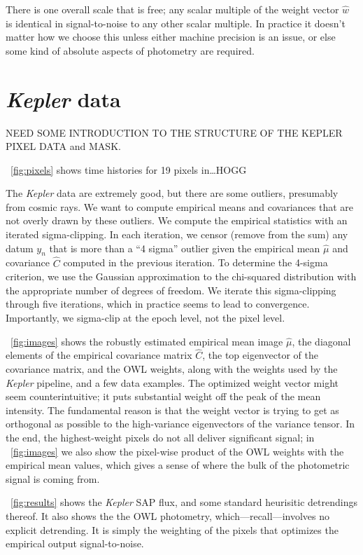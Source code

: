\documentclass[12pt, letterpaper, preprint]{aastex}
\newcommand{\project}[1]{\textsl{#1}}
\begin{document}
There is one overall scale that is free;
  any scalar multiple of the weight vector $\hat{w}$ is identical in signal-to-noise
  to any other scalar multiple.
In practice it doesn't matter how we choose this unless either machine precision is an issue,
  or else some kind of absolute aspects of photometry are required.

\section{\project{Kepler} data}

NEED SOME INTRODUCTION TO THE STRUCTURE OF THE KEPLER PIXEL DATA and MASK.

\figurename~\ref{fig:pixels} shows time histories for 19 pixels in\ldots HOGG

The \project{Kepler} data are extremely good, but there are some outliers,
  presumably from cosmic rays.
We want to compute empirical means and covariances that are not overly drawn by these outliers.
We compute the empirical statistics with an iterated sigma-clipping.
In each iteration, we censor (remove from the sum)
  any datum $y_n$ that is more than a ``4 sigma'' outlier
  given the empirical mean $\hat{\mu}$ and covariance $\hat{C}$ computed in the previous iteration.
To determine the 4-sigma criterion, we use the Gaussian approximation to the chi-squared distribution
  with the appropriate number of degrees of freedom.
We iterate this sigma-clipping through five iterations,
  which in practice seems to lead to convergence.
Importantly, we sigma-clip at the epoch level, not the pixel level.

\figurename~\ref{fig:images} shows the robustly estimated empirical mean image $\hat{\mu}$,
  the diagonal elements of the empirical covariance matrix $\hat{C}$,
  the top eigenvector of the covariance matrix,
  and the OWL weights, along with the weights used by the \project{Kepler} pipeline,
  and a few data examples.
The optimized weight vector might seem counterintuitive;
  it puts substantial weight off the peak of the mean intensity.
The fundamental reason is that the weight vector is trying to get as orthogonal as possible
  to the high-variance eigenvectors of the variance tensor.
In the end, the highest-weight pixels do not all deliver significant signal;
  in \figurename~\ref{fig:images} we also show
  the pixel-wise product of the OWL weights with the empirical mean values,
  which gives a sense of where the bulk of the photometric signal is coming from.

\figurename~\ref{fig:results} shows the \project{Kepler} SAP flux,
  and some standard heurisitic detrendings thereof.
It also shows the the OWL photometry,
  which---recall---involves no explicit detrending.
It is simply the weighting of the pixels that optimizes the empirical output signal-to-noise.
\end{document}
